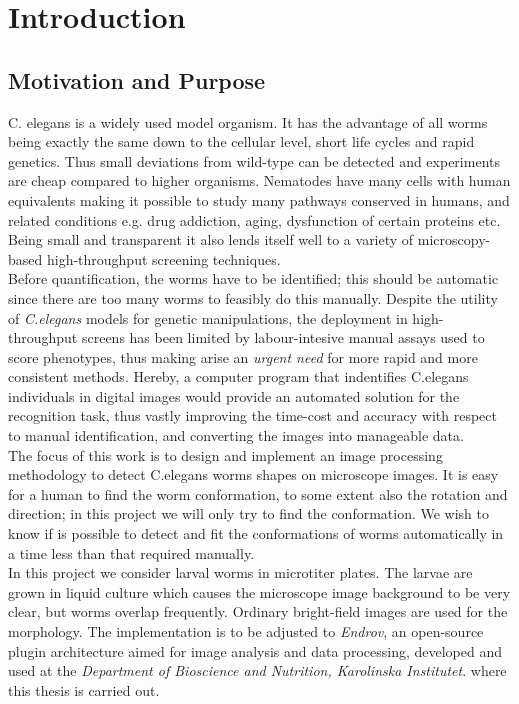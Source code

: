 \cleardoublepage
\thispagestyle{empty}
\chapter{Introduction}

\section{Motivation and Purpose}
\label{sec:motivation}

C. elegans is a widely used model organism. It has the advantage of all worms 
being exactly the same down to the cellular level, short life cycles and rapid
 genetics. Thus small deviations from wild-type can be detected and experiments
 are cheap compared to higher organisms. Nematodes have many cells with human
 equivalents making it possible to study many pathways conserved in humans, 
and related conditions e.g. drug addiction, aging, dysfunction of certain
 proteins etc. Being small and transparent it also lends itself well to a 
variety of microscopy-based high-throughput screening techniques.\\
 
Before quantification, the worms have to be identified; this should be 
automatic since there are too many worms to feasibly do this manually.
Despite the utility of \emph{C.elegans} models for genetic 
manipulations, the deployment in high-throughput screens has been limited by 
labour-intesive manual assays used to score phenotypes, thus making arise
an \emph{urgent need} for more rapid and more consistent methods.
Hereby, a computer
program that indentifies C.elegans individuals in digital images would 
provide an automated solution for the recognition task, thus vastly 
improving the time-cost and accuracy with respect to manual identification, 
and converting the images into manageable data.\\

The focus of this work is to design and implement an image processing
methodology to detect C.elegans worms shapes on microscope images.
It is easy for a human to find the worm conformation,
to some extent also the rotation and direction; in this project we will only 
try to find the conformation. We wish to know if is possible to detect and fit
the conformations of worms automatically in a time less than that required manually.\\

In this project we consider larval worms in microtiter plates. The larvae are 
grown in liquid culture which causes the microscope image background to be 
very clear, but worms overlap frequently. Ordinary bright-field images are 
used for the morphology. The implementation is to be adjusted to \emph{Endrov},
an open-source plugin architecture aimed for image analysis and data processing,
developed and used at the 
\emph{Department of Bioscience and Nutrition, Karolinska Institutet}. 
where this thesis is carried out.

